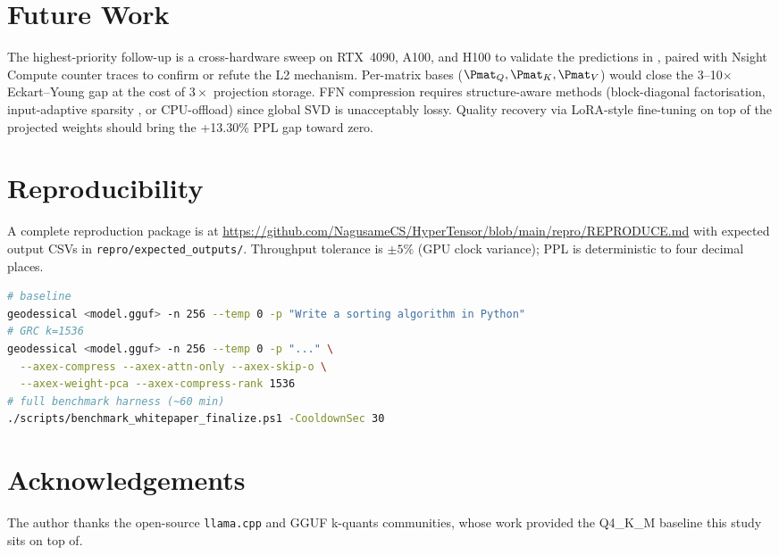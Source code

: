 \documentclass[11pt]{article}
\begin{document}
\section{Future Work}
\label{sec:future}
The highest-priority follow-up is a cross-hardware sweep on RTX~4090, A100,
and H100 to validate the predictions in , paired with
Nsight Compute counter traces to confirm or refute the L2 mechanism.
Per-matrix bases ($\Pmat_Q,\Pmat_K,\Pmat_V$) would close the
3--10$\times$ Eckart--Young gap at the cost of $3\times$ projection storage.
FFN compression requires structure-aware methods (block-diagonal
factorisation, input-adaptive sparsity \cite{elhage2022superposition},
or CPU-offload) since global SVD is unacceptably lossy.  Quality recovery via
LoRA-style \cite{hu2021lora} fine-tuning on top of the projected weights
should bring the +13.30\% PPL gap toward zero.

\section{Reproducibility}
A complete reproduction package is at
\url{https://github.com/NagusameCS/HyperTensor/blob/main/repro/REPRODUCE.md}
with expected output CSVs in
\texttt{repro/expected\_outputs/}.  Throughput tolerance is $\pm 5\%$
(GPU clock variance); PPL is deterministic to four decimal places.

\begin{lstlisting}[language=bash,caption={Headline reproduction.}]
# baseline
geodessical <model.gguf> -n 256 --temp 0 -p "Write a sorting algorithm in Python"
# GRC k=1536
geodessical <model.gguf> -n 256 --temp 0 -p "..." \
  --axex-compress --axex-attn-only --axex-skip-o \
  --axex-weight-pca --axex-compress-rank 1536
# full benchmark harness (~60 min)
./scripts/benchmark_whitepaper_finalize.ps1 -CooldownSec 30
\end{lstlisting}

\section*{Acknowledgements}
The author thanks the open-source \texttt{llama.cpp} \cite{ggerganov2023gguf}
and GGUF k-quants \cite{ggerganov2023kquants} communities, whose work
provided the Q4\_K\_M baseline this study sits on top of.

\appendix
\end{document}
